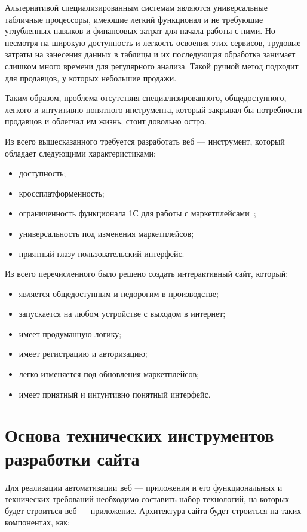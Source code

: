 Альтернативой специализированным системам являются универсальные табличные процессоры, имеющие легкий функционал и не требующие углубленных навыков и финансовых затрат для начала работы с ними. Но несмотря на широкую доступность и легкость освоения этих сервисов, трудовые затраты на занесения данных в таблицы и их последующая обработка занимает слишком много времени для регулярного анализа. Такой ручной метод подходит для продавцов, у которых небольшие продажи.

Таким образом, проблема отсутствия специализированного, общедоступного, легкого и интуитивно понятного инструмента, который закрывал бы потребности продавцов и облегчал им жизнь, стоит довольно остро.

Из всего вышесказанного требуется разработать веб — инструмент, который обладает следующими характеристиками:

\begin{itemize}
 \item доступность;
 \item кроссплатформенность;
 \item ограниченность функционала 1С для работы с маркетплейсами~\cite{integracia1C};
 \item универсальность под изменения маркетплейсов;
 \item приятный глазу пользовательский интерфейс.
\end{itemize}

Из всего перечисленного было решено создать интерактивный сайт, который:
\begin{itemize}
 \item  является общедоступным и недорогим в производстве;
 \item  запускается на любом устройстве с выходом в интернет;
 \item  имеет продуманную логику;
 \item  имеет регистрацию и авторизацию;
 \item  легко изменяется под обновления маркетплейсов;
 \item  имеет приятный и интуитивно понятный интерфейс.
\end{itemize}

\section{Основа технических инструментов разработки сайта}

Для реализации автоматизации веб — приложения и его функциональных и технических требований необходимо составить набор технологий, на которых будет строиться веб — приложение. Архитектура сайта будет строиться на таких компонентах, как:

